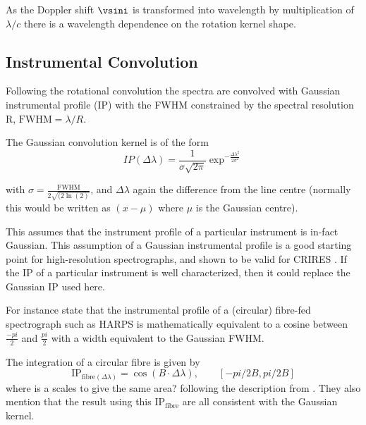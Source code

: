 As the Doppler shift \(\vsini\) is transformed into wavelength by multiplication of $\lambda  / c$ there is a wavelength dependence on the rotation kernel shape.


\subsection{Instrumental Convolution}
Following the rotational convolution the spectra are convolved with Gaussian instrumental profile ({\textrm{IP}}) with the {\textrm{FWHM}}  constrained by the spectral resolution R, $\textrm{FWHM}= \lambda/R$.

The Gaussian convolution kernel is of the form
\begin{equation}
IP(\Delta\lambda) = \frac{1}{\sigma \sqrt{2\pi}} \exp^{-\frac{\Delta\lambda^2}{2 \sigma^2}}    \label{eqn:IP_profile}
\end{equation}

with $\sigma =  \frac{\textrm{FWHM}} {2\sqrt{(2\ln(2)}}$, and $\Delta$$\lambda$ again the difference from the line centre (normally this would be written as $(x-\mu)$ where $\mu$ is the Gaussian centre).

This assumes that the instrument profile of a particular instrument is in-fact Gaussian. This assumption of a Gaussian instrumental profile is a good starting point for high-resolution spectrographs, and shown to be valid for CRIRES \citep{seifahrt_synthesising_2010}.
If the {\textrm{IP}} of a particular instrument is well characterized, then it could replace the Gaussian {\textrm{IP}} used here.

For instance \citet{artigau_optical_2018}  state that the instrumental profile of a (circular) fibre-fed spectrograph such as  {HARPS} is mathematically equivalent to a cosine between $\frac{-pi}{2}$ and $\frac{pi}{2}$ with a width equivalent to the Gaussian {\textrm{FWHM}}.

The integration of a circular fibre is given by
\begin{equation}
\textrm{IP}_{\textrm{fibre}(\Delta\lambda)} = \cos(B\cdot\Delta\lambda) ,  \hspace{2em} [-pi/2B, pi/2B]
\end{equation}
where is a scales to give the same area? 
following the description from \citet{artigau_optical_2018}.  They also mention that the result using this $\textrm{IP}_{\textrm{fibre}}$ are all consistent with the Gaussian kernel.


